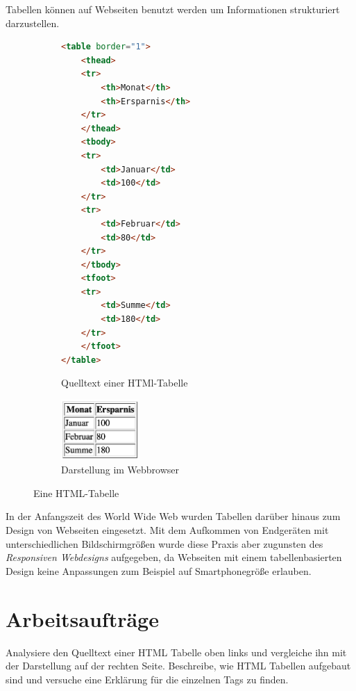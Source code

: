 \documentclass[10pt, a4paper]{arbeitsblatt}
\begin{document}
\ReiheTitel

Tabellen können auf Webseiten benutzt werden um Informationen
strukturiert darzustellen.

\begin{figure}[ht]
	\begin{subfigure}[b]{.5\linewidth}
		\begin{lstlisting}[language=HTML]
<table border="1">
	<thead>
	<tr>
		<th>Monat</th>
		<th>Ersparnis</th>
	</tr>
	</thead>
	<tbody>
	<tr>
		<td>Januar</td>
		<td>100</td>
	</tr>
	<tr>
		<td>Februar</td>
		<td>80</td>
	</tr>
	</tbody>
	<tfoot>
	<tr>
		<td>Summe</td>
		<td>180</td>
	</tr>
	</tfoot>
</table>
		\end{lstlisting}
		\caption{Quelltext einer HTMl-Tabelle}\label{lst:tabelle}
	\end{subfigure}%
	\begin{subfigure}[b]{.5\linewidth}\centering
		\includegraphics[width=3cm]{8Diff-AB.5-Abb_Tabelle.png}
		\caption{Darstellung im Webbrowser}\label{abb:tabelle-render}
	\end{subfigure}
	\caption{Eine HTML-Tabelle}\label{abb:tabelle}
\end{figure}

\begin{rahmen}\small
	In der Anfangszeit des World Wide Web wurden Tabellen darüber hinaus
	zum Design von Webseiten eingesetzt. Mit dem Aufkommen von Endgeräten
	mit unterschiedlichen Bildschirmgrößen wurde diese Praxis aber zugunsten
	des \emph{Responsiven Webdesigns} aufgegeben, da Webseiten mit einem
	tabellenbasierten Design keine Anpassungen zum Beispiel auf
	Smartphonegröße erlauben.
\end{rahmen}

\section*{Arbeitsaufträge}
\begin{aufgabe}[icon=\iconHeft]
	Analysiere den Quelltext einer HTML Tabelle oben links und vergleiche
	ihn mit der Darstellung auf der rechten Seite. Beschreibe, wie HTML
	Tabellen aufgebaut sind und versuche eine Erklärung für die einzelnen
	Tags zu finden.
\end{aufgabe}
\end{document}
